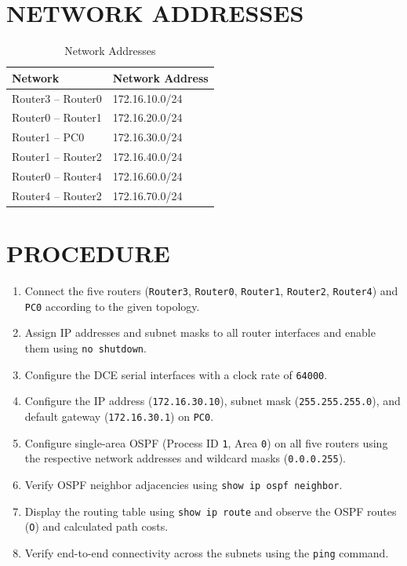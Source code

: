 \documentclass[12pt,a4paper]{article}
\begin{document}
\section*{NETWORK ADDRESSES}
\begin{table}[H]
	\centering
	\begin{tabular}{|l|l|}
		\hline
		\textbf{Network} & \textbf{Network Address} \\ \hline
		Router3 -- Router0 & 172.16.10.0/24 \\ \hline
		Router0 -- Router1 & 172.16.20.0/24 \\ \hline
		Router1 -- PC0     & 172.16.30.0/24 \\ \hline
		Router1 -- Router2 & 172.16.40.0/24 \\ \hline
		Router0 -- Router4 & 172.16.60.0/24 \\ \hline
		Router4 -- Router2 & 172.16.70.0/24 \\ \hline
	\end{tabular}
	\caption{Network Addresses}
\end{table}

\section*{PROCEDURE}
\begin{enumerate}
	\item Connect the five routers (\texttt{Router3}, \texttt{Router0}, \texttt{Router1}, \texttt{Router2}, \texttt{Router4}) and \texttt{PC0} according to the given topology.
	\item Assign IP addresses and subnet masks to all router interfaces and enable them using \texttt{no shutdown}.
	\item Configure the DCE serial interfaces with a clock rate of \texttt{64000}.
	\item Configure the IP address (\texttt{172.16.30.10}), subnet mask (\texttt{255.255.255.0}), and default gateway (\texttt{172.16.30.1}) on \texttt{PC0}.
	\item Configure single-area OSPF (Process ID \texttt{1}, Area \texttt{0}) on all five routers using the respective network addresses and wildcard masks (\texttt{0.0.0.255}).
	\item Verify OSPF neighbor adjacencies using \texttt{show ip ospf neighbor}.
	\item Display the routing table using \texttt{show ip route} and observe the OSPF routes (\texttt{O}) and calculated path costs.
	\item Verify end-to-end connectivity across the subnets using the \texttt{ping} command.
\end{enumerate}
\end{document}
